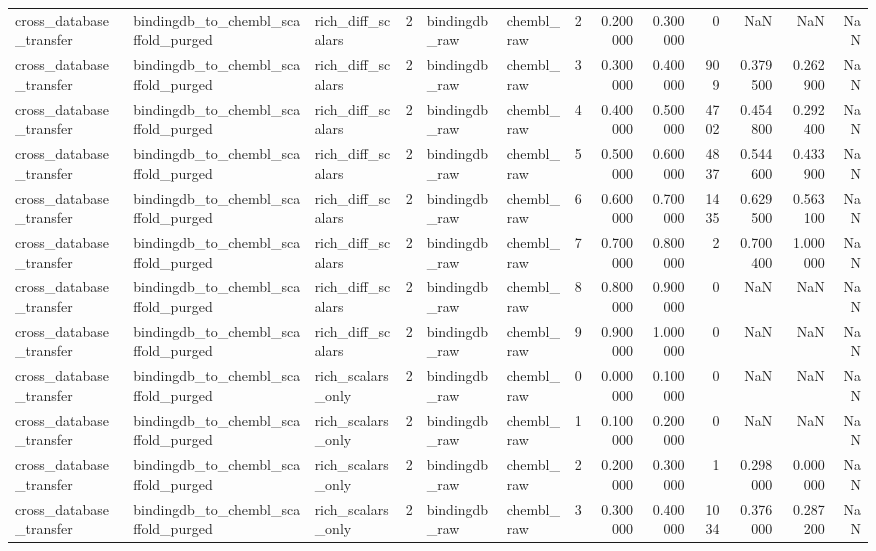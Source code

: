 \begin{longtable}{lllrllrrrrrrr}
cross\_database\_transfer & bindingdb\_to\_chembl\_scaffold\_purged & rich\_diff\_scalars & 2 & bindingdb\_raw & chembl\_raw & 2 & 0.200000 & 0.300000 & 0 & NaN & NaN & NaN \\
cross\_database\_transfer & bindingdb\_to\_chembl\_scaffold\_purged & rich\_diff\_scalars & 2 & bindingdb\_raw & chembl\_raw & 3 & 0.300000 & 0.400000 & 909 & 0.379500 & 0.262900 & NaN \\
cross\_database\_transfer & bindingdb\_to\_chembl\_scaffold\_purged & rich\_diff\_scalars & 2 & bindingdb\_raw & chembl\_raw & 4 & 0.400000 & 0.500000 & 4702 & 0.454800 & 0.292400 & NaN \\
cross\_database\_transfer & bindingdb\_to\_chembl\_scaffold\_purged & rich\_diff\_scalars & 2 & bindingdb\_raw & chembl\_raw & 5 & 0.500000 & 0.600000 & 4837 & 0.544600 & 0.433900 & NaN \\
cross\_database\_transfer & bindingdb\_to\_chembl\_scaffold\_purged & rich\_diff\_scalars & 2 & bindingdb\_raw & chembl\_raw & 6 & 0.600000 & 0.700000 & 1435 & 0.629500 & 0.563100 & NaN \\
cross\_database\_transfer & bindingdb\_to\_chembl\_scaffold\_purged & rich\_diff\_scalars & 2 & bindingdb\_raw & chembl\_raw & 7 & 0.700000 & 0.800000 & 2 & 0.700400 & 1.000000 & NaN \\
cross\_database\_transfer & bindingdb\_to\_chembl\_scaffold\_purged & rich\_diff\_scalars & 2 & bindingdb\_raw & chembl\_raw & 8 & 0.800000 & 0.900000 & 0 & NaN & NaN & NaN \\
cross\_database\_transfer & bindingdb\_to\_chembl\_scaffold\_purged & rich\_diff\_scalars & 2 & bindingdb\_raw & chembl\_raw & 9 & 0.900000 & 1.000000 & 0 & NaN & NaN & NaN \\
cross\_database\_transfer & bindingdb\_to\_chembl\_scaffold\_purged & rich\_scalars\_only & 2 & bindingdb\_raw & chembl\_raw & 0 & 0.000000 & 0.100000 & 0 & NaN & NaN & NaN \\
cross\_database\_transfer & bindingdb\_to\_chembl\_scaffold\_purged & rich\_scalars\_only & 2 & bindingdb\_raw & chembl\_raw & 1 & 0.100000 & 0.200000 & 0 & NaN & NaN & NaN \\
cross\_database\_transfer & bindingdb\_to\_chembl\_scaffold\_purged & rich\_scalars\_only & 2 & bindingdb\_raw & chembl\_raw & 2 & 0.200000 & 0.300000 & 1 & 0.298000 & 0.000000 & NaN \\
cross\_database\_transfer & bindingdb\_to\_chembl\_scaffold\_purged & rich\_scalars\_only & 2 & bindingdb\_raw & chembl\_raw & 3 & 0.300000 & 0.400000 & 1034 & 0.376000 & 0.287200 & NaN \\

\end{longtable}
